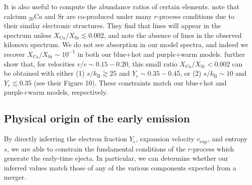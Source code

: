 \documentclass[twocolumn, twocolappendix]{aastex63}
\begin{document}
It is also useful to compute the abundance ratios of certain elements. \cite{domoto21} note that calcium ${}_{20}$Ca and Sr are co-produced under many $r$-process conditions due to their similar electronic structures. They find that  lines will appear in the spectrum unless $X_{\mathrm{Ca}} / X_{\mathrm{Sr}} \lesssim 0.002$, and note the absence of  lines in the observed kilonova spectrum. We do not see  absorption in our model spectra, and indeed we recover $X_{\mathrm{Ca}} / X_{\mathrm{Sr}} \sim 10^{-5}$ in both our blue+hot and purple+warm models. \cite{domoto21} further show that, for velocities $v/c \sim 0.15 - 0.20$, this small ratio $X_{\mathrm{Ca}} / X_{\mathrm{Sr}} < 0.002$ can be obtained with either (1) $s/k_{\mathrm{B}} \gtrsim 25$ and $Y_e \sim 0.35-0.45$, or (2) $s/k_{\mathrm{B}} \sim 10$ and $Y_e \lesssim 0.35$ (see their Figure 10). These constraints match our blue+hot and purple+warm models, respectively.



\subsection{Physical origin of the early emission}\label{ssc:physical_origin}

By directly inferring the electron fraction $Y_e$, expansion velocity $v_{\mathrm{exp}}$, and entropy $s$, we are able to constrain the fundamental conditions of the $r$-process which generate the early-time ejecta. In particular, we can determine whether our inferred values match those of any of the various components expected from a merger. 
\end{document}
